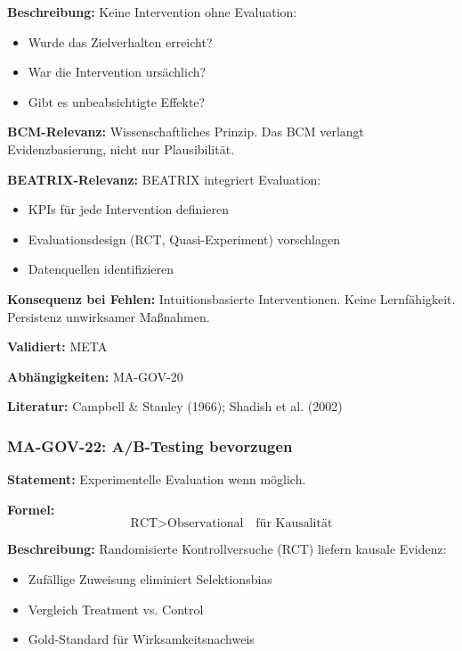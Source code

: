 \textbf{Beschreibung:}
Keine Intervention ohne Evaluation:
\begin{itemize}
    \item Wurde das Zielverhalten erreicht?
    \item War die Intervention ursächlich?
    \item Gibt es unbeabsichtigte Effekte?
\end{itemize}

\textbf{BCM-Relevanz:}
Wissenschaftliches Prinzip. Das BCM verlangt Evidenzbasierung, nicht nur Plausibilität.

\textbf{BEATRIX-Relevanz:}
BEATRIX integriert Evaluation:
\begin{itemize}
    \item KPIs für jede Intervention definieren
    \item Evaluationsdesign (RCT, Quasi-Experiment) vorschlagen
    \item Datenquellen identifizieren
\end{itemize}

\textbf{Konsequenz bei Fehlen:}
Intuitionsbasierte Interventionen. Keine Lernfähigkeit. Persistenz unwirksamer Maßnahmen.

\textbf{Validiert:} META

\textbf{Abhängigkeiten:} MA-GOV-20

\textbf{Literatur:} Campbell \& Stanley (1966); Shadish et al. (2002)


\subsubsection*{MA-GOV-22: A/B-Testing bevorzugen}

\textbf{Statement:} Experimentelle Evaluation wenn möglich.

\textbf{Formel:}
\begin{equation}
\text{RCT} > \text{Observational} \quad \text{für Kausalität}
\end{equation}

\textbf{Beschreibung:}
Randomisierte Kontrollversuche (RCT) liefern kausale Evidenz:
\begin{itemize}
    \item Zufällige Zuweisung eliminiert Selektionsbias
    \item Vergleich Treatment vs. Control
    \item Gold-Standard für Wirksamkeitsnachweis
\end{itemize}

